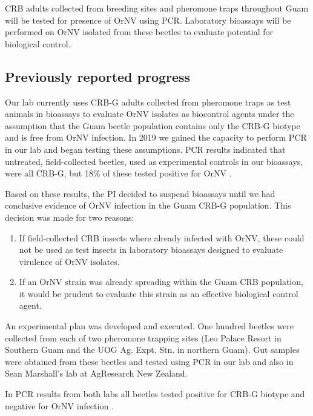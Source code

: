 \documentclass[12pt,letterpaper,english,bibliography=totocnumbered, abstract=on]{scrartcl}
\begin{document}
\begin{framed}
CRB adults collected from breeding sites and pheromone traps throughout Guam will be tested for presence of OrNV using PCR.  Laboratory bioassays will be performed on OrNV isolated from these beetles to evaluate potential for biological control.
\end{framed} 

\subsection{Previously reported progress}

Our lab currently uses CRB-G adults collected from pheromone traps as test animals in bioassays to evaluate OrNV isolates as biocontrol agents under the assumption that the Guam beetle population contains only the CRB-G biotype and is free from OrNV infection. In 2019 we gained the capacity to perform PCR in our lab and began testing these assumptions. PCR results indicated that untreated, field-collected beetles, used as experimental controls in our bioassays, were all CRB-G, but 18\% of these tested positive for OrNV \cite{graselaTechnicalReportPolymerase2020, graselaTechnicalReportPolymerase2020a}.

Based on these results, the PI decided to suspend bioassays until we had conclusive evidence of OrNV infection in the Guam CRB-G population.  This decision was made for two reasons:

\begin{enumerate}
	\item If field-collected CRB insects where already infected with OrNV, these could not be used as test insects in laboratory bioassays designed to evaluate virulence of OrNV isolates.
	\item If an OrNV strain was already spreading within the Guam CRB population, it would be prudent to evaluate this strain as an effective biological control agent. 
\end{enumerate}

An experimental plan \cite{mooreExperimentalPlanDetermining2020} was developed and executed. One hundred beetles were collected from each of two pheromone trapping sites (Leo Palace Resort in Southern Guam and the UOG Ag. Expt. Stn. in northern Guam). Gut samples were obtained from these beetles and tested using PCR in our lab and also in Sean Marshall's lab at AgResearch New Zealand. 

In PCR results from both labs all beetles tested positive for CRB-G biotype and negative for OrNV infection \cite{graselaInvestigationDeterminePresence2020}. 
\end{document}
